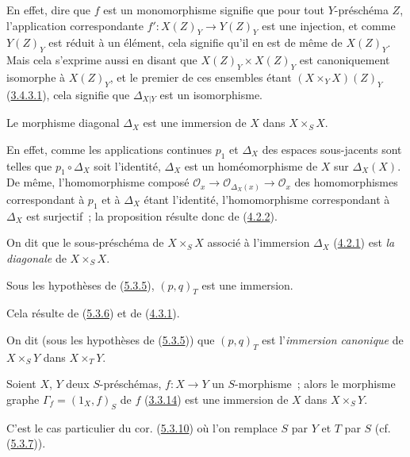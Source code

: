 En effet, dire que $f$ est un monomorphisme signifie que pour tout
$Y$-préschéma $Z$, l'application correspondante
$f':X(Z)_Y\to Y(Z)_Y$ est une injection, et comme $Y(Z)_Y$ est réduit à un
élément, cela signifie qu'il en est de même de $X(Z)_Y$. Mais cela s'exprime
aussi en disant que $X(Z)_Y\times X(Z)_Y$ est canoniquement isomorphe à
$X(Z)_Y$, et le premier de ces ensembles étant $(X\times_Y X)(Z)_Y$
(\hyperref[I.3.4.3.1-fr]{3.4.3.1}), cela signifie que $\Delta_{X|Y}$ est un
isomorphisme.

\begin{proposition}[5.3.9]
\label{I.5.3.9-fr}
Le morphisme diagonal $\Delta_X$ est une immersion de $X$ dans
$X\times_S X$.
\end{proposition}

En effet, comme les applications continues $p_1$ et $\Delta_X$ des espaces
sous-jacents sont telles que $p_1\circ\Delta_X$ soit l'identité, $\Delta_X$
est un homéomorphisme de $X$ sur $\Delta_X(X)$. De même, l'homomorphisme
composé
$\mathscr{O}_x\to\mathscr{O}_{\Delta_X(x)}\to\mathscr{O}_x$ des
homomorphismes correspondant à $p_1$ et à $\Delta_X$ étant l'identité,
l'homomorphisme correspondant à $\Delta_X$ est surjectif~; la proposition
résulte donc de (\hyperref[I.4.2.2-fr]{4.2.2}).

On dit que le sous-préschéma de $X\times_S X$ associé à l'immersion
$\Delta_X$ (\hyperref[I.4.2.1-fr]{4.2.1}) est \emph{la diagonale} de
$X\times_S X$.

\begin{corollary}[5.3.10]
\label{I.5.3.10-fr}
Sous les hypothèses de (\hyperref[I.5.3.5-fr]{5.3.5}), $(p,q)_T$ est une
immersion.
\end{corollary}

Cela résulte de (\hyperref[I.5.3.6-fr]{5.3.6}) et de
(\hyperref[I.4.3.1-fr]{4.3.1}).

On dit (sous les hypothèses de (\hyperref[I.5.3.5-fr]{5.3.5})) que $(p,q)_T$
est l'\emph{immersion canonique} de $X\times_S Y$ dans $X\times_T Y$.

\begin{corollary}[5.3.11]
\label{I.5.3.11-fr}
Soient $X$, $Y$ deux $S$-préschémas, $f:X\to Y$ un $S$-morphisme~; alors le
morphisme graphe $\Gamma_f=(1_X,f)_S$ de $f$
(\hyperref[I.3.3.14-fr]{3.3.14}) est une immersion de $X$ dans
$X\times_S Y$.
\end{corollary}

C'est le cas particulier du cor. (\hyperref[I.5.3.10-fr]{5.3.10}) où l'on
remplace $S$ par $Y$ et $T$ par $S$
(cf. (\hyperref[I.5.3.7-fr]{5.3.7})).

